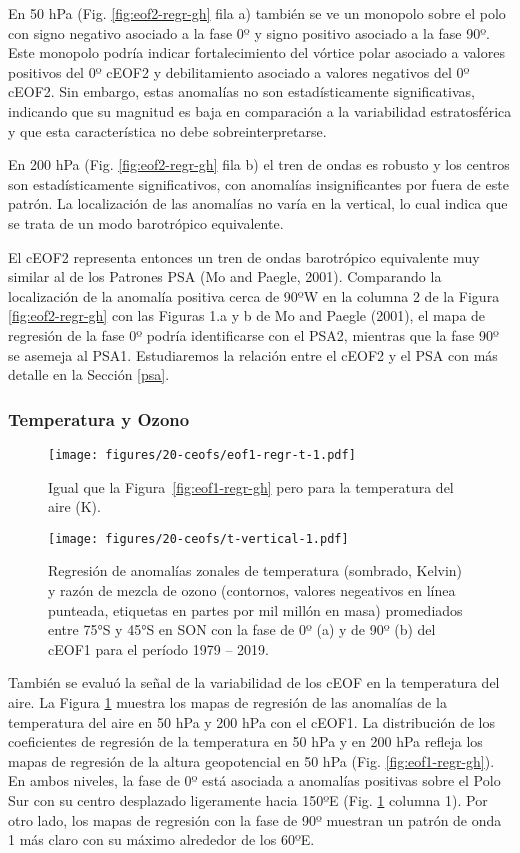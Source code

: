 \documentclass[12pt,oneside]{reedthesis}
\begin{document}
En 50 hPa (Fig. \ref{fig:eof2-regr-gh} fila a) también se ve un monopolo sobre el polo con signo negativo asociado a la fase 0º y signo positivo asociado a la fase 90º.
Este monopolo podría indicar fortalecimiento del vórtice polar asociado a valores positivos del 0º cEOF2 y debilitamiento asociado a valores negativos del 0º cEOF2.
Sin embargo, estas anomalías no son estadísticamente significativas, indicando que su magnitud es baja en comparación a la variabilidad estratosférica y que esta característica no debe sobreinterpretarse.

En 200 hPa (Fig. \ref{fig:eof2-regr-gh} fila b) el tren de ondas es robusto y los centros son estadísticamente significativos, con anomalías insignificantes por fuera de este patrón.
La localización de las anomalías no varía en la vertical, lo cual indica que se trata de un modo barotrópico equivalente.

El cEOF2 representa entonces un tren de ondas barotrópico equivalente muy similar al de los Patrones PSA (Mo and Paegle, 2001).
Comparando la localización de la anomalía positiva cerca de 90ºW en la columna 2 de la Figura \ref{fig:eof2-regr-gh} con las Figuras 1.a y b de Mo and Paegle (2001), el mapa de regresión de la fase 0º podría identificarse con el PSA2, mientras que la fase 90º se asemeja al PSA1.
Estudiaremos la relación entre el cEOF2 y el PSA con más detalle en la Sección \ref{psa}.

\hypertarget{temperatura-y-ozono}{%
\subsubsection{Temperatura y Ozono}\label{temperatura-y-ozono}}


\begin{figure}
\centering
\texttt{[image: figures/20-ceofs/eof1-regr-t-1.pdf]}
\caption{\label{fig:eof1-regr-t}Igual que la Figura~\ref{fig:eof1-regr-gh} pero para la temperatura del aire (K).}
\end{figure}

\begin{figure}
\centering
\texttt{[image: figures/20-ceofs/t-vertical-1.pdf]}
\caption{\label{fig:t-vertical}Regresión de anomalías zonales de temperatura (sombrado, Kelvin) y razón de mezcla de ozono (contornos, valores negeativos en línea punteada, etiquetas en partes por mil millón en masa) promediados entre 75°S y 45°S en SON con la fase de 0º (a) y de 90º (b) del cEOF1 para el período 1979 -- 2019.}
\end{figure}
También se evaluó la señal de la variabilidad de los cEOF en la temperatura del aire.
La Figura \ref{fig:eof1-regr-t} muestra los mapas de regresión de las anomalías de la temperatura del aire en 50 hPa y 200 hPa con el cEOF1.
La distribución de los coeficientes de regresión de la temperatura en 50 hPa y en 200 hPa refleja los mapas de regresión de la altura geopotencial en 50 hPa (Fig. \ref{fig:eof1-regr-gh}).
En ambos niveles, la fase de 0º está asociada a anomalías positivas sobre el Polo Sur con su centro desplazado ligeramente hacia 150ºE (Fig. \ref{fig:eof1-regr-t} columna 1).
Por otro lado, los mapas de regresión con la fase de 90º muestran un patrón de onda 1 más claro con su máximo alrededor de los 60ºE.
\end{document}
